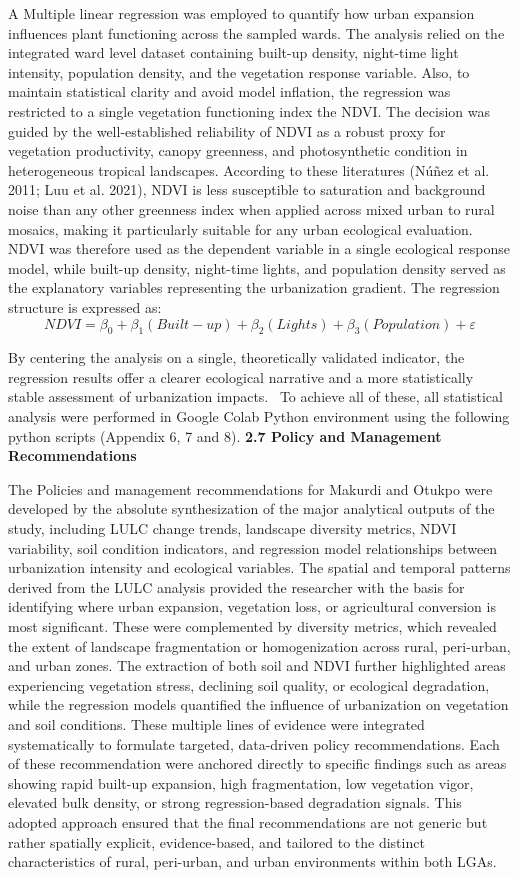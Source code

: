 A Multiple linear regression was employed to quantify how urban expansion influences plant functioning across the sampled wards. The analysis relied on the integrated ward level dataset containing built-up density, night-time light intensity, population density, and the vegetation response variable. Also, to maintain statistical clarity and avoid model inflation, the regression was restricted to a single vegetation functioning index the NDVI. The decision was guided by the well-established reliability of NDVI as a robust proxy for vegetation productivity, canopy greenness, and photosynthetic condition in heterogeneous tropical landscapes. According to these literatures (Núñez et al. 2011; Luu et al. 2021), NDVI is less susceptible to saturation and background noise than any other greenness index when applied across mixed urban to rural mosaics, making it particularly suitable for any urban ecological evaluation.
NDVI was therefore used as the dependent variable in a single ecological response model, while built-up density, night-time lights, and population density served as the explanatory variables representing the urbanization gradient. The regression structure is expressed as:
~\emph{\hfill\break
}\[NDVI = \beta_{0} + \beta_{1}(Built - up) + \beta_{2}(Lights) + \beta_{3}(Population) + \varepsilon\]

By centering the analysis on a single, theoretically validated indicator, the regression results offer a clearer ecological narrative and a more statistically stable assessment of urbanization impacts.~ To achieve all of these, all statistical analysis were performed in Google Colab Python environment using the following python scripts (Appendix 6, 7 and 8).
{}\textbf{2.7 Policy and Management Recommendations}

The Policies and management recommendations for Makurdi and Otukpo were developed by the absolute synthesization of the major analytical outputs of the study, including LULC change trends, landscape diversity metrics, NDVI variability, soil condition indicators, and regression model relationships between urbanization intensity and ecological variables. The spatial and temporal patterns derived from the LULC analysis provided the researcher with the basis for identifying where urban expansion, vegetation loss, or agricultural conversion is most significant. These were complemented by diversity metrics, which revealed the extent of landscape fragmentation or homogenization across rural, peri-urban, and urban zones. The extraction of both soil and NDVI further highlighted areas experiencing vegetation stress, declining soil quality, or ecological degradation, while the regression models quantified the influence of urbanization on vegetation and soil conditions.
These multiple lines of evidence were integrated systematically to formulate targeted, data-driven policy recommendations. Each of these recommendation were anchored directly to specific findings such as areas showing rapid built-up expansion, high fragmentation, low vegetation vigor, elevated bulk density, or strong regression-based degradation signals. This adopted approach ensured that the final recommendations are not generic but rather spatially explicit, evidence-based, and tailored to the distinct characteristics of rural, peri-urban, and urban environments within both LGAs.
